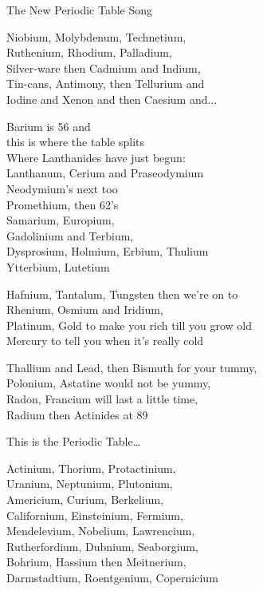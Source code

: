 \begin{song}{The New Periodic Table Song}
  \begin{SBVerse}
    Niobium, Molybdenum, Technetium,\\
    Ruthenium, Rhodium, Palladium,\\
    Silver-ware then Cadmium and Indium,\\
    Tin-cans, Antimony, then Tellurium and\\
    Iodine and Xenon and then Caesium and...
  \end{SBVerse}
     
  \begin{SBVerse}
    Barium is 56 and\\
    this is where the table splits\\
    Where Lanthanides have just begun:\\
    Lanthanum, Cerium and Praseodymium\\
    Neodymium's next too\\
    Promethium, then 62's\\
    Samarium, Europium,\\
    Gadolinium and Terbium,\\
    Dysprosium, Holmium, Erbium, Thulium\\
    Ytterbium, Lutetium
  \end{SBVerse}
     
  \begin{SBVerse}
    Hafnium, Tantalum, Tungsten then we're on to\\
    Rhenium, Osmium and Iridium,\\
    Platinum, Gold to make you rich till you grow old\\
    Mercury to tell you when it's really cold
  \end{SBVerse}
     
  \begin{SBVerse}
    Thallium and Lead, then Bismuth for your tummy,\\
    Polonium, Astatine would not be yummy,\\
    Radon, Francium will last a little time,\\
    Radium then Actinides at 89
  \end{SBVerse}
     
  \begin{SBChorus}
    This is the Periodic Table\ldots
  \end{SBChorus}
     
  \begin{SBVerse}
    Actinium, Thorium, Protactinium,\\
    Uranium, Neptunium, Plutonium,\\
    Americium, Curium, Berkelium,\\
    Californium, Einsteinium, Fermium,\\
    Mendelevium, Nobelium, Lawrencium,\\
    Rutherfordium, Dubnium, Seaborgium,\\
    Bohrium, Hassium then Meitnerium,\\
    Darmstadtium, Roentgenium, Copernicium
  \end{SBVerse}
     

\end{song}
